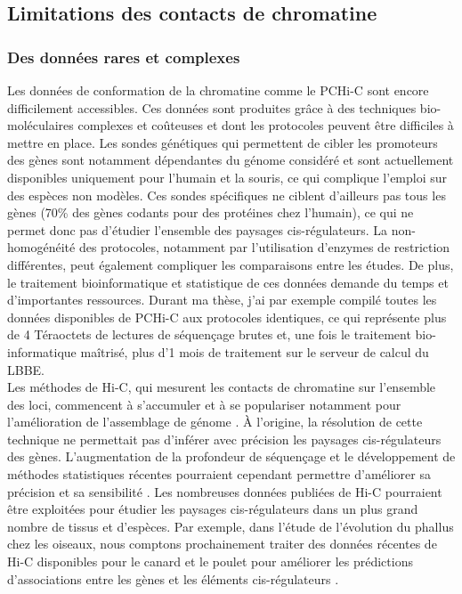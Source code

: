 \subsection{Limitations des contacts de chromatine}
\subsubsection*{Des données rares et complexes}
Les données de conformation de la chromatine comme le \acrshort{PCHi-C} sont encore difficilement accessibles. Ces données sont produites grâce à des techniques bio-moléculaires complexes et coûteuses et dont les protocoles peuvent être difficiles à mettre en place. Les sondes génétiques qui permettent de cibler les promoteurs des gènes sont notamment dépendantes du génome considéré et sont actuellement disponibles uniquement pour l’humain et la souris, ce qui complique l’emploi sur des espèces non modèles. Ces sondes spécifiques ne ciblent d’ailleurs pas tous les gènes (70\% des gènes codants pour des protéines chez l’humain), ce qui ne permet donc pas d’étudier l’ensemble des paysages \gls{cis}-régulateurs. La non-homogénéité des protocoles, notamment par l’utilisation d'enzymes de restriction différentes, peut également compliquer les comparaisons entre les études. De plus, le traitement bioinformatique et statistique de ces données demande du temps et d’importantes ressources. Durant ma thèse, j’ai par exemple compilé toutes les données disponibles de \acrshort{PCHi-C} aux protocoles identiques, ce qui représente plus de 4 Téraoctets de lectures de séquençage brutes et, une fois le traitement bio-informatique maîtrisé, plus d’1 mois de traitement sur le serveur de calcul du LBBE. \\

Les méthodes de Hi-C, qui mesurent les contacts de chromatine sur l’ensemble des loci, commencent à s’accumuler et à se populariser notamment pour l’amélioration de l’assemblage de génome \citep{ghurye_integrating_2019}. À l’origine, la résolution de cette technique ne permettait pas d’inférer avec précision les paysages \gls{cis}-régulateurs des gènes. L’augmentation de la profondeur de séquençage et le développement de méthodes statistiques récentes pourraient cependant permettre d’améliorer sa précision et sa sensibilité \citep{lagler_hic-act_2021}. Les nombreuses données publiées de Hi-C pourraient être exploitées pour étudier les paysages \gls{cis}-régulateurs dans un plus grand nombre de tissus et d’espèces. Par exemple, dans l’étude de l’évolution du phallus chez les oiseaux, nous comptons prochainement traiter des données récentes de Hi-C disponibles pour le canard et le poulet pour améliorer les prédictions d’associations entre les gènes et les éléments \gls{cis}-régulateurs \citep{zhu_three_2021, fishman_3d_2019, li_comparative_2022}.

